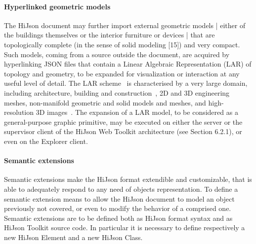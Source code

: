 \documentclass{sig-alternate}
\begin{document}
\paragraph{Hyperlinked geometric models}

The HiJson document may further import external geometric models | either of the buildings themselves or the interior furniture or devices | that are topologically complete (in the sense of solid modeling [15]) and very compact. Such models, coming from a source outside the document, are acquired by hyperlinking JSON files that contain a Linear Algebraic Representation (LAR) of topology and geometry, to be expanded for visualization or interaction at any useful level of detail.
The LAR scheme~\cite{Dicarlo:2014:TNL:2543138.2543294} is characterised by a very large domain, including architecture, building and construction~\cite{paoluzziMS:2014}, 2D and 3D engineering meshes, non-manifold geometric and solid models and meshes, and high-resolution 3D images~\cite{cadanda:2015}. 
The expansion of a LAR model, to be considered as a general-purpose graphic primitive, may be executed on either the server or the supervisor client of the HiJson Web Toolkit architecture (see Section 6.2.1), or even on the Explorer client.

\paragraph{Semantic extensions}
Semantic extensions make the HiJson format extendible and customizable, that is able to adequately respond to any need of objects representation. To define a semantic extension means to allow the HiJson document to model an object previously not covered, or even to modify the behavior of a comprised one. Semantic extensions are to be defined both as HiJson format syntax and as HiJson Toolkit source code. In particular it is necessary to define respectively a new HiJson Element and a new HiJson Class.
\end{document}
